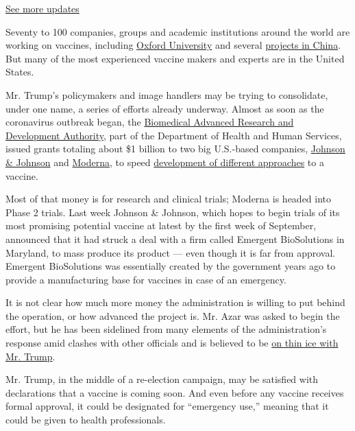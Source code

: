 \href{https://www.nytimes.com/2020/07/31/us/elections/biden-vs-trump.html?action=click\&pgtype=Article\&state=default\&region=MAIN_CONTENT_1\&context=storylines_live_updates}{See
more updates}

Seventy to 100 companies, groups and academic institutions around the
world are working on vaccines, including
\href{https://www.nytimes.com/2020/04/27/world/europe/coronavirus-vaccine-update-oxford.html}{Oxford
University} and several
\href{https://www.nytimes.com/2020/04/10/business/coronavirus-vaccine-nationalism.html}{projects
in China}. But many of the most experienced vaccine makers and experts
are in the United States.

Mr. Trump's policymakers and image handlers may be trying to
consolidate, under one name, a series of efforts already underway.
Almost as soon as the coronavirus outbreak began, the
\href{https://www.phe.gov/about/barda/Pages/default.aspx}{Biomedical
Advanced Research and Development Authority}, part of the Department of
Health and Human Services, issued grants totaling about \$1 billion to
two big U.S.-based companies,
\href{https://www.nytimes.com/2020/05/19/business/johnson-baby-powder-sales-stopped.html}{Johnson
\& Johnson} and
\href{https://www.nytimes.com/2020/03/16/health/coronavirus-vaccine.html}{Moderna},
to speed
\href{https://www.nytimes.com/2020/04/08/health/coronavirus-vaccines.html}{development
of different approaches} to a vaccine.

Most of that money is for research and clinical trials; Moderna is
headed into Phase 2 trials. Last week Johnson \& Johnson, which hopes to
begin trials of its most promising potential vaccine at latest by the
first week of September, announced that it had struck a deal with a firm
called Emergent BioSolutions in Maryland, to mass produce its product
--- even though it is far from approval. Emergent BioSolutions was
essentially created by the government years ago to provide a
manufacturing base for vaccines in case of an emergency.

It is not clear how much more money the administration is willing to put
behind the operation, or how advanced the project is. Mr. Azar was asked
to begin the effort, but he has been sidelined from many elements of the
administration's response amid clashes with other officials and is
believed to be
\href{https://www.nytimes.com/2020/04/29/us/politics/coronavirus-trump-azar.html}{on
thin ice with Mr. Trump}.

Mr. Trump, in the middle of a re-election campaign, may be satisfied
with declarations that a vaccine is coming soon. And even before any
vaccine receives formal approval, it could be designated for ``emergency
use,'' meaning that it could be given to health professionals.

